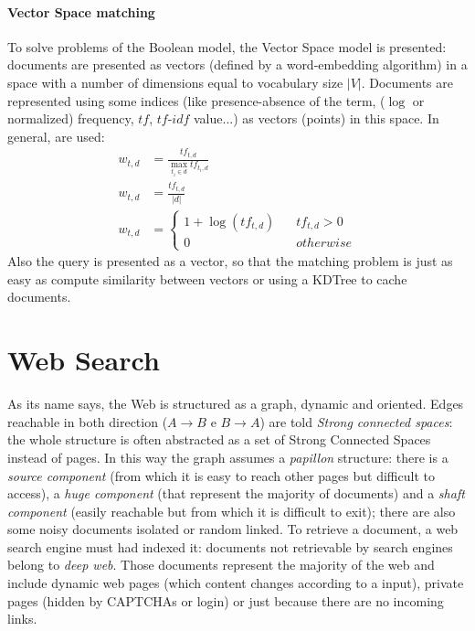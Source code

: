 \documentclass[11pt, a4page]{article}
\begin{document}
\subsection{Vector Space matching}
To solve problems of the Boolean model, the Vector Space model is presented: documents  are presented as vectors (defined by a word-embedding algorithm) in a space with a number of dimensions equal to vocabulary size $|V|$.
Documents are represented using some indices (like presence-absence of the term, ($\log$ or normalized) frequency, $tf$, $tf\text{-}idf$ value...) as vectors (points) in this space.
In general, are used:
\begin{align*}
  w_{t, d} &= \frac{tf_{t,d}}{\displaystyle \max_{t_i \in d} tf_{t_i, d}} \\
  w_{t, d} &= \frac{tf_{t, d}}{|d|} \\
  w_{t, d} &= \begin{cases}
    1 + \log(tf_{t, d}) \hspace{10pt} &tf_{t, d} > 0 \\
    0 & otherwise
    \end{cases}
\end{align*}
Also the query is presented as a vector, so that the matching problem is just as easy as compute similarity between vectors or using a KDTree to cache documents.

\newpage
\part{Web Search}
As its name says, the Web is structured as a graph, dynamic and oriented.
Edges reachable in both direction ($A \to B$ e $B \to A$) are told \textit{Strong connected spaces}: the whole structure is often abstracted as a set of Strong Connected Spaces instead of pages.
In this way the graph assumes a \textit{papillon} structure: there is a \textit{source component} (from which it is easy to reach other pages but difficult to access), a \textit{huge component} (that represent the majority of documents) and a \textit{shaft component} (easily reachable but from which it is difficult to exit); there are also some noisy documents isolated or random linked.
To retrieve a document, a web search engine must had indexed it: documents not retrievable by search engines belong to \textit{deep web}.
Those documents represent the majority of the web and include dynamic web pages (which content changes according to a input), private pages (hidden by CAPTCHAs or login) or just because there are no incoming links.
\end{document}
